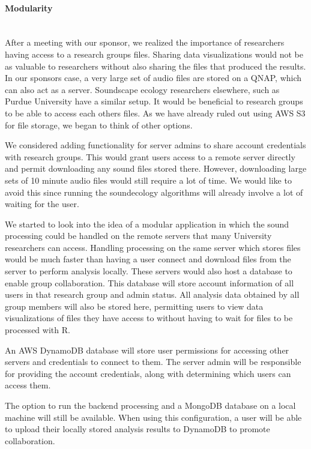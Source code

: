 \paragraph{Modularity} \mbox{}\\[\paragraphheaderspace]
After a meeting with our sponsor, we realized the importance of researchers having access to a research group\textquotesingle s files. Sharing data visualizations would not be as valuable to researchers without also sharing the files that produced the results. In our sponsor\textquotesingle s case, a very large set of audio files are stored on a QNAP, which can also act as a server. Soundscape ecology researchers elsewhere, such as Purdue University have a similar setup. It would be beneficial to research groups to be able to access each other\textquotesingle s files. As we have already ruled out using AWS S3 for file storage, we began to think of other options.\par
We considered adding functionality for server admins to share account credentials with research groups. This would grant users access to a remote server directly and permit downloading any sound files stored there. However, downloading large sets of 10 minute audio files would still require a lot of time. We would like to avoid this since running the soundecology algorithms will already involve a lot of waiting for the user.\par
We started to look into the idea of a modular application in which the sound processing could be handled on the remote servers that many University researchers can access. Handling processing on the same server which stores files would be much faster than having a user connect and download files from the server to perform analysis locally. These servers would also host a database to enable group collaboration. This database will store account information of all users in that research group and admin status. All analysis data obtained by all group members will also be stored here, permitting users to view data visualizations of files they have access to without having to wait for files to be processed with R.\par
An AWS DynamoDB database will store user permissions for accessing other servers and credentials to connect to them. The server admin will be responsible for providing the account credentials, along with determining which users can access them.\par
The option to run the backend processing and a MongoDB database on a local machine will still be available. When using this configuration, a user will be able to upload their locally stored analysis results to DynamoDB to promote collaboration.\par

